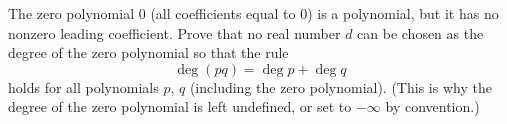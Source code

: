 The zero polynomial $0$ (all coefficients equal to $0$) is a polynomial, but it has no nonzero leading coefficient. Prove that no real number $d$ can be chosen as the degree of the zero polynomial so that the rule
\[
\deg(pq)=\deg p+\deg q
\]
holds for all polynomials $p$, $q$ (including the zero polynomial). (This is why the degree of the zero polynomial is left undefined, or set to $-\infty$ by convention.)
